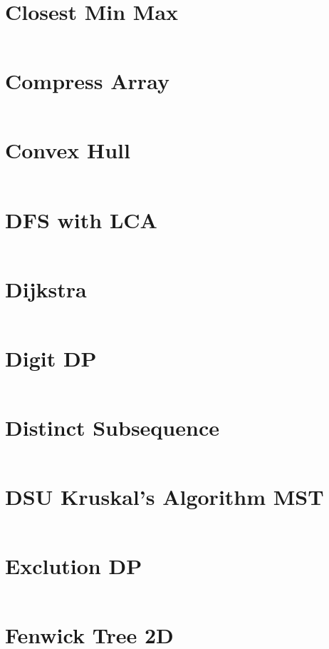 \documentclass[10pt,a4paper,landscape]{article}
\begin{document}
\begin{multicols*}{3}
		\section{Closest Min Max}
		\inputminted{cpp}{codes/CLOSEST_MIN_MAX.cpp}
		
		\section{Compress Array}
		\inputminted{cpp}{codes/COMPRESS_ARRAY.cpp}
		
		\section{Convex Hull}
		\inputminted{cpp}{codes/CONVEX_HULL.cpp}
		
		\section{DFS with LCA}
		\inputminted{cpp}{codes/DFS_with_LCA.cpp}
		
		\section{Dijkstra}
		\inputminted{cpp}{codes/DIJKSTRA.cpp}
		
		\section{Digit DP}
		\inputminted{cpp}{codes/DIGIT_DP.cpp}
		
		\section{Distinct Subsequence}
		\inputminted{cpp}{codes/DISTINCT_SUBSEQUENCE.cpp}
		
		\section{DSU Kruskal's Algorithm MST}
		\inputminted{cpp}{codes/DSU_KRUSKALS_ALGORITHM_MST.cpp}
		
		\section{Exclution DP}
		\inputminted{cpp}{codes/exclutionDP.cpp}
		
		\section{Fenwick Tree 2D}
		\inputminted{cpp}{codes/FENWICK_TREE_2D.cpp}
		

\end{multicols*}
\end{document}
